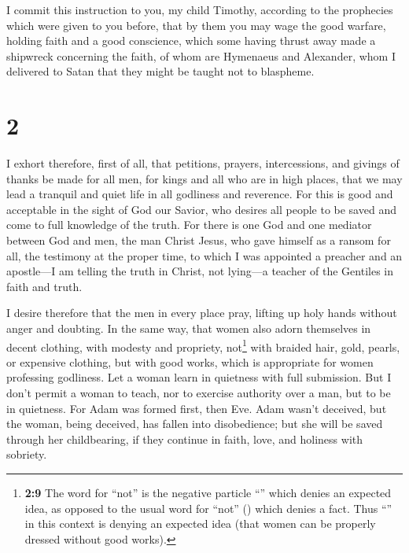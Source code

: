  I commit this instruction to you, my child Timothy,
according to the prophecies which were given to you before, that by them
you may wage the good warfare,  holding faith and a good
conscience, which some having thrust away made a shipwreck concerning
the faith,  of whom are Hymenaeus and Alexander, whom I
delivered to Satan that they might be taught not to blaspheme.

\hypertarget{section-1}{%
\section{2}\label{section-1}}

 I exhort therefore, first of all, that petitions,
prayers, intercessions, and givings of thanks be made for all men,
 for kings and all who are in high places, that we may
lead a tranquil and quiet life in all godliness and reverence.
 For this is good and acceptable in the sight of God our
Savior,  who desires all people to be saved and come to
full knowledge of the truth.  For there is one God and one
mediator between God and men, the man Christ Jesus,  who
gave himself as a ransom for all, the testimony at the proper time,
 to which I was appointed a preacher and an apostle---I am
telling the truth in Christ, not lying---a teacher of the Gentiles in
faith and truth.

 I desire therefore that the men in every place pray,
lifting up holy hands without anger and doubting.  In the
same way, that women also adorn themselves in decent clothing, with
modesty and propriety, not\footnote{\textbf{2:9} The word for ``not'' is
  the negative particle ``'' which denies an expected idea, as
  opposed to the usual word for ``not'' () which denies a
  fact. Thus ``'' in this context is denying an expected idea
  (that women can be properly dressed without good works).} with braided
hair, gold, pearls, or expensive clothing,  but with good
works, which is appropriate for women professing godliness.
 Let a woman learn in quietness with full submission.
 But I don't permit a woman to teach, nor to exercise
authority over a man, but to be in quietness.  For Adam
was formed first, then Eve.  Adam wasn't deceived, but
the woman, being deceived, has fallen into disobedience; 
but she will be saved through her childbearing, if they continue in
faith, love, and holiness with sobriety.

